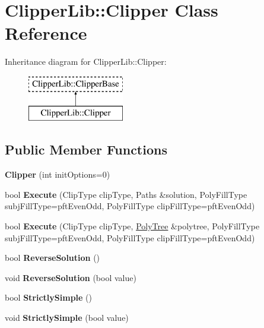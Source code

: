 \hypertarget{class_clipper_lib_1_1_clipper}{}\section{Clipper\+Lib\+:\+:Clipper Class Reference}
\label{class_clipper_lib_1_1_clipper}
Inheritance diagram for Clipper\+Lib\+:\+:Clipper\+:\begin{figure}[H]
\begin{center}
\leavevmode
\includegraphics[height=2.000000cm]{class_clipper_lib_1_1_clipper}
\end{center}
\end{figure}
\subsection*{Public Member Functions}
\begin{DoxyCompactItemize}
\item 
\hypertarget{class_clipper_lib_1_1_clipper_adceb8536f6a80e8f115213dba9208427}{}\label{class_clipper_lib_1_1_clipper_adceb8536f6a80e8f115213dba9208427} 
{\bfseries Clipper} (int init\+Options=0)
\item 
\hypertarget{class_clipper_lib_1_1_clipper_a06da196a4b4151edd2e5426ed48744cf}{}\label{class_clipper_lib_1_1_clipper_a06da196a4b4151edd2e5426ed48744cf} 
bool {\bfseries Execute} (Clip\+Type clip\+Type, Paths \&solution, Poly\+Fill\+Type subj\+Fill\+Type=pft\+Even\+Odd, Poly\+Fill\+Type clip\+Fill\+Type=pft\+Even\+Odd)
\item 
\hypertarget{class_clipper_lib_1_1_clipper_aceb19a1e5a5c9e31067f4d1177793403}{}\label{class_clipper_lib_1_1_clipper_aceb19a1e5a5c9e31067f4d1177793403} 
bool {\bfseries Execute} (Clip\+Type clip\+Type, \hyperlink{class_clipper_lib_1_1_poly_tree}{Poly\+Tree} \&polytree, Poly\+Fill\+Type subj\+Fill\+Type=pft\+Even\+Odd, Poly\+Fill\+Type clip\+Fill\+Type=pft\+Even\+Odd)
\item 
\hypertarget{class_clipper_lib_1_1_clipper_ad556ba9961f498de02d55dc95bc5a889}{}\label{class_clipper_lib_1_1_clipper_ad556ba9961f498de02d55dc95bc5a889} 
bool {\bfseries Reverse\+Solution} ()
\item 
\hypertarget{class_clipper_lib_1_1_clipper_a44afc0c82a1d2607829b5fd21f7644ef}{}\label{class_clipper_lib_1_1_clipper_a44afc0c82a1d2607829b5fd21f7644ef} 
void {\bfseries Reverse\+Solution} (bool value)
\item 
\hypertarget{class_clipper_lib_1_1_clipper_a50eb4c514466ed37fd365769e0bcf67b}{}\label{class_clipper_lib_1_1_clipper_a50eb4c514466ed37fd365769e0bcf67b} 
bool {\bfseries Strictly\+Simple} ()
\item 
\hypertarget{class_clipper_lib_1_1_clipper_a85aa82d75e0d7d1f380d2e96231d6aa3}{}\label{class_clipper_lib_1_1_clipper_a85aa82d75e0d7d1f380d2e96231d6aa3} 
void {\bfseries Strictly\+Simple} (bool value)
\end{DoxyCompactItemize}
